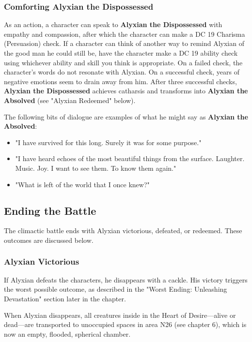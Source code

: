 \documentclass[10pt,a4paper,twoside,bg=print,twocolumn,openany,nodeprecatedcode]{dndbook}
\begin{document}
\subsubsection{Comforting Alyxian the Dispossessed}
As an action, a character can speak to \textbf{Alyxian the Dispossessed} with empathy and compassion, after which the character can make a DC 19 Charisma (Persuasion) check. If a character can think of another way to remind Alyxian of the good man he could still be, have the character make a DC 19 ability check using whichever ability and skill you think is appropriate. On a failed check, the character's words do not resonate with Alyxian. On a successful check, years of negative emotions seem to drain away from him. After three successful checks, \textbf{Alyxian the Dispossessed} achieves catharsis and transforms into \textbf{Alyxian the Absolved} (see "Alyxian Redeemed" below).

The following bits of dialogue are examples of what he might say as \textbf{Alyxian the Absolved}:


\begin{itemize}
\item "I have survived for this long. Surely it was for some purpose."
\item "I have heard echoes of the most beautiful things from the surface. Laughter. Music. Joy. I want to see them. To know them again."
\item "What is left of the world that I once knew?"
\end{itemize}

\subsection{Ending the Battle}
The climactic battle ends with Alyxian victorious, defeated, or redeemed. These outcomes are discussed below.

\subsubsection{Alyxian Victorious}
If Alyxian defeats the characters, he disappears with a cackle. His victory triggers the worst possible outcome, as described in the "Worst Ending: Unleashing Devastation" section later in the chapter.

When Alyxian disappears, all creatures inside in the Heart of Desire—alive or dead—are transported to unoccupied spaces in area N26 (see chapter 6), which is now an empty, flooded, spherical chamber.
\end{document}
